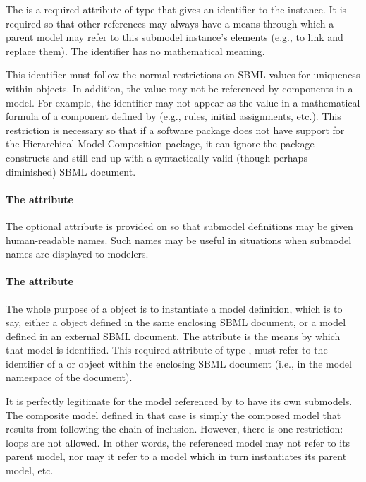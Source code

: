The  is a required attribute of type  that gives
an identifier to the \Submodel instance.  It is required so that other
references may always have a means through which a parent model may
refer to this submodel instance's elements (e.g., to link and replace
them).  The identifier has no mathematical meaning.

This identifier must follow the normal restrictions on SBML
 values for uniqueness within \Model objects.  In
addition, the  value may not be referenced by \sbmlthreecore
components in a model.  For example, the identifier may not appear
as the  value in a mathematical formula of a component
defined by \sbmlthreecore (e.g., rules, initial assignments, etc.).
This restriction is necessary so that if a software package does not
have support for the Hierarchical Model Composition package, it can
ignore the package constructs and still end up with a syntactically
valid (though perhaps diminished) SBML document.


\paragraph{The \fixttspace{} attribute}

The optional  attribute is provided on \Submodel so that
submodel definitions may be given human-readable names.  Such names may
be useful in situations when submodel names are displayed to modelers.


\paragraph{The \fixttspace{} attribute}
\label{submodel-modelref}
  
The whole purpose of a \Submodel object is to instantiate a model
definition, which is to say, either a \Model object defined in the same
enclosing SBML document, or a model defined in an external SBML
document.  The  attribute is the means by which that
model is identified.  This required attribute of type ,
must refer to the identifier of a \Model or \ExternalModelDefinition
object within the enclosing SBML document (i.e., in the model namespace
of the document).

It is perfectly legitimate for the model referenced by 
to have its own submodels.  The composite model defined in that case is
simply the composed model that results from following the chain of
inclusion.  However, there is one restriction: loops are not allowed.
In other words, the referenced model may not refer to its parent model,
nor may it refer to a model which in turn instantiates its parent model,
etc.

